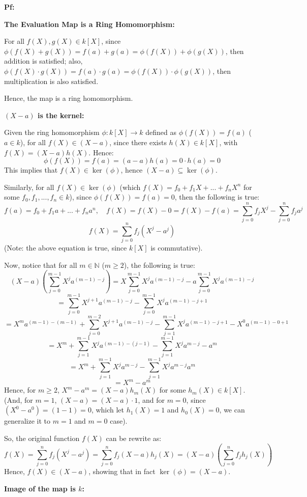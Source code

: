 \documentclass{article}
\begin{document}
\textbf{Pf:}

\textbf{The Evaluation Map is a Ring Homomorphism:}

For all $f(X),g(X)\in k[X]$, since $\phi(f(X)+g(X))=f(a)+g(a)=\phi(f(X))+\phi(g(X))$, then addition is satisfied;
also, $\phi(f(X)\cdot g(X))=f(a)\cdot g(a)=\phi(f(X))\cdot \phi(g(X))$, then multiplication is also satisfied.

Hence, the map is a ring homomorphism.

\hfill

\textbf{$(X-a)$ is the kernel:}

Given the ring homomorphism $\phi:k[X]\rightarrow k$ defined as $\phi(f(X))=f(a)$ ($a\in k$), 
for all $f(X)\in (X-a)$, since there exists $h(X)\in k[X]$, with $f(X)=(X-a)h(X)$. Hence:
$$\phi(f(X))=f(a)=(a-a)h(a)=0\cdot h(a)=0$$
This implies that $f(X)\in \ker(\phi)$, hence $(X-a)\subseteq \ker(\phi)$.

\hfill

Similarly, for all $f(X)\in \ker(\phi)$ (which $f(X)=f_0+f_1X+...+f_nX^n$ for some $f_0,f_1,...,f_n\in k$), since $\phi(f(X))=f(a)=0$, then the following is true:
$$f(a)=f_0+f_1a+...+f_na^n,\quad f(X)=f(X)-0=f(X)-f(a)=\sum_{j=0}^{n}f_jX^j-\sum_{j=0}^{n}f_ja^j$$
$$f(X)=\sum_{j=0}^{n}f_j(X^j-a^j)$$
(Note: the above equation is true, since $k[X]$ is commutative).

Now, notice that for all $m\in\mathbb{N}$ ($m\geq 2$), the following is true:
$$(X-a)\left(\sum_{j=0}^{m-1}X^ja^{(m-1)-j}\right)=X\sum_{j=0}^{m-1}X^ja^{(m-1)-j}-a\sum_{j=0}^{m-1}X^ja^{(m-1)-j}$$
$$=\sum_{j=0}^{m-1}X^{j+1}a^{(m-1)-j}-\sum_{j=0}^{m-1}X^ja^{(m-1)-j+1}$$
$$=X^ma^{(m-1)-(m-1)}+\sum_{j=0}^{m-2}X^{j+1}a^{(m-1)-j}-\sum_{j=1}^{m-1}X^ja^{(m-1)-j+1}-X^0a^{(m-1)-0+1}$$
$$=X^m+\sum_{j=1}^{m-1}X^{j}a^{(m-1)-(j-1)}-\sum_{j=1}^{m-1}X^ja^{m-j}-a^{m}$$
$$=X^m+\sum_{j=1}^{m-1}X^{j}a^{m-j}-\sum_{j=1}^{m-1}X^ja^{m-j}a^{m}$$
$$=X^m-a^m$$
Hence, for $m\geq 2$, $X^m-a^m=(X-a)h_m(X)$ for some $h_m(X)\in k[X]$. (And, for $m=1$, $(X-a)=(X-a)\cdot 1$, and for $m=0$, since $(X^0-a^0)=(1-1)=0$, which let $h_1(X)=1$ and $h_0(X)=0$, we can generalize it to $m=1$ and $m=0$ case).

So, the original function $f(X)$ can be rewrite as:
$$f(X)=\sum_{j=0}^{n}f_j(X^j-a^j)=\sum_{j=0}^{n}f_j(X-a)h_j(X) = (X-a)\left(\sum_{j=0}^{n}f_jh_j(X)\right)$$
Hence, $f(X)\in (X-a)$, showing that in fact $\ker(\phi)=(X-a)$.

\hfill

\textbf{Image of the map is $k$:}
\end{document}
